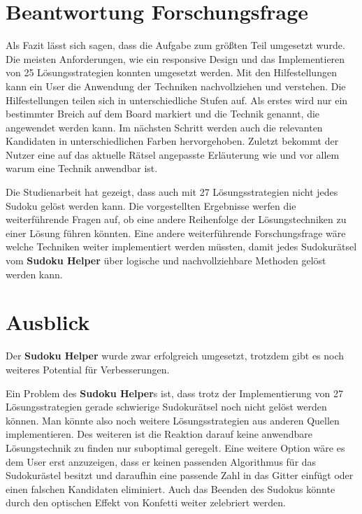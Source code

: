 \section{Beantwortung Forschungsfrage}

Als Fazit lässt sich sagen, dass die Aufgabe zum größten Teil umgesetzt wurde. Die meisten Anforderungen, wie ein responsive Design und das Implementieren von 25 Lösungsstrategien konnten umgesetzt werden. Mit den Hilfestellungen kann ein User die Anwendung der Techniken nachvollziehen und verstehen. Die Hilfestellungen teilen sich in unterschiedliche Stufen auf. Als erstes wird nur ein bestimmter Breich auf dem Board markiert und die Technik genannt, die angewendet werden kann. Im nächsten Schritt werden auch die relevanten Kandidaten in unterschiedlichen Farben hervorgehoben. Zuletzt bekommt der Nutzer eine auf das aktuelle Rätsel angepasste Erläuterung wie und vor allem warum eine Technik anwendbar ist.

Die Studienarbeit hat gezeigt, dass auch mit 27 Lösungsstrategien nicht jedes Sudoku gelöst werden kann. Die vorgestellten Ergebnisse werfen die weiterführende Fragen auf, ob eine andere Reihenfolge der Lösungstechniken zu einer Lösung führen könnten. Eine andere weiterführende Forschungsfrage wäre welche Techniken weiter implementiert werden müssten, damit jedes Sudokurätsel vom \textbf{Sudoku Helper} über logische und nachvollziehbare Methoden gelöst werden kann.

\section{Ausblick}

Der \textbf{Sudoku Helper} wurde zwar erfolgreich umgesetzt, trotzdem gibt es noch weiteres Potential für Verbesserungen.

Ein Problem des \textbf{Sudoku Helper}s ist, dass trotz der Implementierung von 27 Lösungsstrategien gerade schwierige Sudokurätsel noch nicht gelöst werden können. Man könnte also noch weitere Lösungsstrategien aus anderen Quellen implementieren. Des weiteren ist die Reaktion darauf keine anwendbare Lösungstechnik zu finden nur suboptimal geregelt. Eine weitere Option wäre es dem User erst anzuzeigen, dass er keinen passenden Algorithmus für das Sudokurästel besitzt und daraufhin eine passende Zahl in das Gitter einfügt oder einen falschen Kandidaten eliminiert. Auch das Beenden des Sudokus könnte durch den optischen Effekt von Konfetti weiter zelebriert werden.

